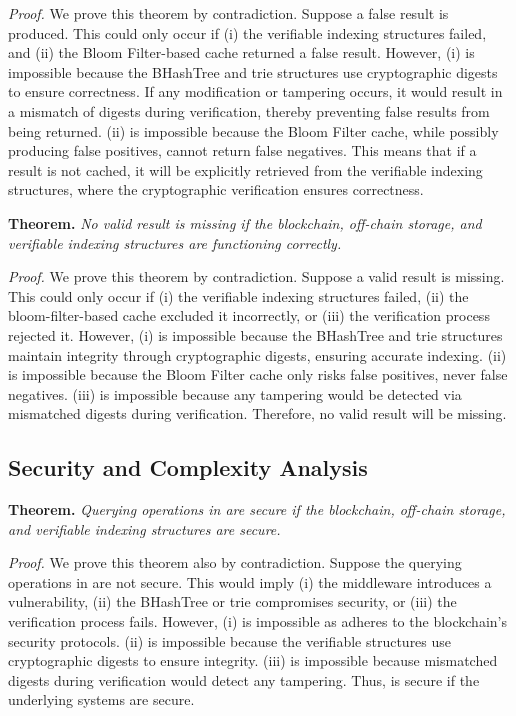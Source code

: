 \noindent \textit{Proof.} 
We prove this theorem by contradiction. 
Suppose a false result is produced. 
This could only occur if (i) the verifiable indexing structures failed, and (ii) the Bloom Filter-based cache returned a false result. 
However, (i) is impossible because the BHashTree and trie structures use cryptographic digests to ensure correctness.
If any modification or tampering occurs, it would result in a mismatch of digests during verification, thereby preventing false results from being returned. 
(ii) is impossible because the Bloom Filter cache, while possibly producing false positives, cannot return false negatives.
This means that if a result is not cached, it will be explicitly retrieved from the verifiable indexing structures, where the cryptographic verification ensures correctness.


\noindent \textbf{Theorem.} \emph{No valid result is missing if the blockchain, off-chain storage, and verifiable indexing structures are functioning correctly.}


\noindent \textit{Proof.} 
We prove this theorem by contradiction. Suppose a valid result is missing. 
This could only occur if (i) the verifiable indexing structures failed, (ii) the bloom-filter-based cache excluded it incorrectly, or (iii) the verification process rejected it. 
However, (i) is impossible because the BHashTree and trie structures maintain integrity through cryptographic digests, ensuring accurate indexing. 
(ii) is impossible because the Bloom Filter cache only risks false positives, never false negatives.
(iii) is impossible because any tampering would be detected via mismatched digests during verification. 
Therefore, no valid result will be missing.


\subsection{Security and Complexity Analysis}
\label{sec:SecurityAnalysis}


\textbf{Theorem.} 
\emph{Querying operations in \Chain are secure if the blockchain, off-chain storage, and verifiable indexing structures are secure.}


\noindent \textit{Proof.} 
We prove this theorem also by contradiction. 
Suppose the querying operations in \Chain are not secure. 
This would imply (i) the middleware introduces a vulnerability, (ii) the BHashTree or trie compromises security, or (iii) the verification process fails. 
However, (i) is impossible as \Chain adheres to the blockchain's security protocols. 
(ii) is impossible because the verifiable structures use cryptographic digests to ensure integrity. 
(iii) is impossible because mismatched digests during verification would detect any tampering. 
Thus, \Chain is secure if the underlying systems are secure.


